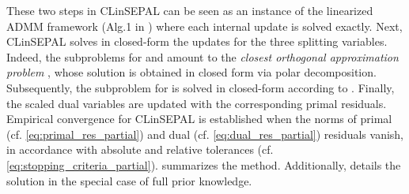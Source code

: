 These two steps in CLinSEPAL can be seen as an instance of the linearized ADMM framework (Alg.1 in \citealp{lu2021linearized}) where each internal update is solved exactly. Next, CLinSEPAL solves in closed-form the updates for the three splitting variables.
Indeed, the subproblems for \YO and \YT amount to the \emph{closest orthogonal approximation problem} \cite{fan1955some,higham1986computing}, whose solution is obtained in closed form via polar decomposition.
Subsequently, the subproblem for \X is solved in closed-form according to .
Finally, the scaled dual variables are updated with the corresponding primal residuals.
Empirical convergence for CLinSEPAL is established when the norms of primal (cf. \cref{eq:primal_res_partial}) and dual (cf. \cref{eq:dual_res_partial}) residuals vanish, in accordance with absolute and relative tolerances (cf. \cref{eq:stopping_criteria_partial}).
 summarizes the method.
Additionally,  details the solution in the special case of full prior knowledge.